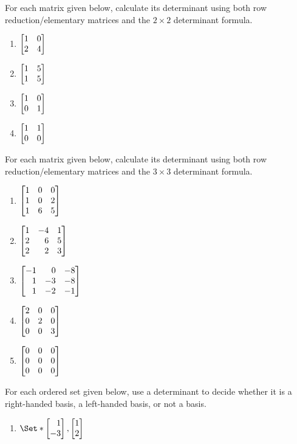 \begin{exercises}
	\begin{problist}
		\prob For each matrix given below, calculate its determinant
		using both row reduction/elementary matrices and the $2\times 2$ determinant formula.
		\begin{enumerate}
			\item $\mat{1 & 0 \\ 2 & 4}$

			\item $\mat{1 & 5 \\ 1 & 5}$

			\item $\mat{1 & 0 \\ 0 & 1}$

			\item $\mat{1 & 1 \\ 0 & 0}$
		\end{enumerate}
		\prob For each matrix given below, calculate its determinant
		using both row reduction/elementary matrices and the $3\times 3$ determinant formula.
		\begin{enumerate}
			\item $\mat{1 & 0 & 0 \\ 1 & 0 & 2 \\ 1 & 6 & 5}$

			\item $\mat{1 & -4 & 1 \\ 2 & 6 & 5 \\ 2 & 2 & 3}$

			\item $\mat{-1 & 0 & -8 \\ 1 & -3 & -8 \\ 1 & -2 & -1}$

			\item $\mat{2 & 0 & 0 \\ 0 & 2 & 0 \\ 0 & 0 & 3}$

			\item $\mat{0 & 0 & 0 \\ 0 & 0 & 0 \\ 0 & 0 & 0}$
		\end{enumerate}
		\prob For each ordered set given below, use
		a determinant to decide whether it is a right-handed basis, a left-handed basis,
		or not a basis.
		\begin{enumerate}
			\item $\Set*{\mat{1 \\ -3},\mat{1 \\ 2}}$


\end{enumerate}
\end{problist}
\end{exercises}
